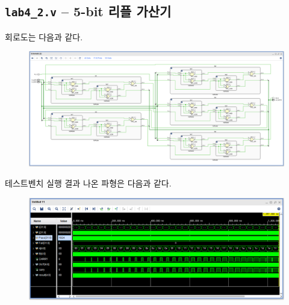 \documentclass{scrartcl}
\begin{document}
\subsection{\texttt{lab4\_2.v} -- 5-bit 리플 가산기}
회로도는 다음과 같다.
\begin{figure}[H]
  \centering
  \includegraphics[width=0.9\linewidth]{lab4_2_schematic.png}
\end{figure}
테스트벤치 실행 결과 나온 파형은 다음과 같다.
\begin{figure}[H]
  \centering
  \includegraphics[width=0.9\linewidth]{lab4_2_waveform.png}
\end{figure}
\end{document}
